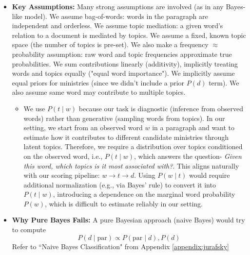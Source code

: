 \documentclass{report}
\begin{document}
\begin{itemize}
    \item \textbf{Key Assumptions:} Many strong assumptions are involved (as in any Bayes-like model). We assume bag-of-words: words in the paragraph are independent and orderless. We assume topic mediation: a given word's relation to a document is mediated by topics. We assume a fixed, known topic space (the number of topics is pre-set). We also make a frequency $\approx$ probability assumption: raw word and topic frequencies approximate true probabilities. We sum contributions linearly (additivity), implicitly treating words and topics equally ("equal word importance"). We implicitly assume equal priors for ministries (since we didn't include a prior $P(d)$ term). We also assume same word may contribute to multiple topics.
        \begin{itemize} \item We use $P(t \mid w)$ because our task is diagnostic (inference from observed words) rather than generative (sampling words from topics). In our setting, we start from an observed word $w$ in a paragraph and want to estimate how it contributes to different candidate ministries through latent topics. Therefore, we require a distribution over topics conditioned on the observed word, i.e., $P(t\mid w)$, which answers the question- \textit{Given this word, which topics is it most associated with?}. This aligns naturally with our scoring pipeline: $w \rightarrow t \rightarrow d$. Using $P(w \mid t)$ would require additional normalization (e.g., via Bayes' rule) to convert it into $P(t \mid w)$, introducing a dependence on the marginal word probability $P(w)$, which is difficult to estimate reliably in our setting.\end{itemize}
    \item \textbf{Why Pure Bayes Fails:} A pure Bayesian approach (naive Bayes) would try to compute 
    $$P(d\mid\text{par})\propto P(\text{par}\mid d),P(d)$$
    Refer to ``Naive Bayes Classification" from Appendix \ref{appendix:jurafsky}


\end{itemize}
\end{document}
